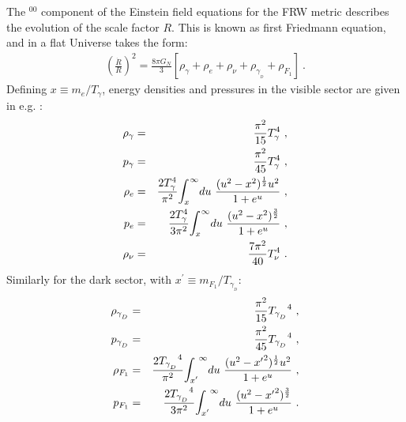 \documentclass[12pt]{article}
\begin{document}
The $^{00}$ component of the Einstein field equations for the FRW metric describes the evolution of the scale factor $R$. This is known as first Friedmann equation, and in a flat Universe takes the form:
%
\begin{eqnarray}
\left ( \frac{\dot{R}}{R} \right ) ^2 = \frac{8\pi G_N}{3} \left [\rho _{\gamma} + \rho _e + \rho _{\nu} + \rho _{\gamma _{_D}} + \rho _{F_1} \right ] \ .
\label{Friedmann}
\end{eqnarray}
%
Defining $x \equiv m _e/T _{\gamma}$, energy densities and pressures in the visible sector are given in e.g. \cite{earlyuniverse}:
%
\begin{eqnarray}
\rho _{\gamma} &=& \frac{\pi ^2}{15} T _{\gamma} ^4 \ , \nonumber \\
p _{\gamma} &=& \frac{\pi ^2}{45} T _{\gamma} ^4 \ , \nonumber \\
\rho _e &=& \frac{2T _{\gamma} ^4}{\pi ^2} \mathlarger \int _{x} ^{\infty}du \ \frac{(u^2 - x^2)^{\frac{1}{2}}u^2}{1 + e^u} \ , \nonumber \\
p _e &=& \frac{2T _{\gamma} ^4}{3\pi ^2} \mathlarger \int _{x} ^{\infty}du \ \frac{(u^2 - x^2)^{\frac{3}{2}}}{1 + e^u} \ , \nonumber \\
\rho _{\nu} &=& \frac{7\pi ^2}{40} T _{\nu} ^4 \ .
\end{eqnarray}
%
Similarly for the dark sector, with $x ^{'} \equiv m _{F_1}/T _{\gamma _{_D}}$:
%
\begin{eqnarray}
\rho _{\gamma _{_D}} &=& \frac{\pi ^2}{15} {T _{\gamma _{_D}}}^4 \ , \nonumber \\
p _{\gamma _{_D}} &=& \frac{\pi ^2}{45} {T _{\gamma _{_D}}} ^4 \ , \nonumber \\
\rho _{F_1} &=& \frac{2{T _{\gamma _{_D}}} ^4}{\pi ^2} \mathlarger \int _{x'} ^{\infty}du \ \frac{(u^2 - {x'}^2)^{\frac{1}{2}}u^2}{1 + e^u} \ , \nonumber \\
p _{F_1} &=& \frac{2{T _{\gamma _{_D}}} ^4}{3\pi ^2} \mathlarger \int _{x'} ^{\infty}du \ \frac{(u^2 - {x'}^2)^{\frac{3}{2}}}{1 + e^u} \ .
\end{eqnarray}
%
\end{document}

